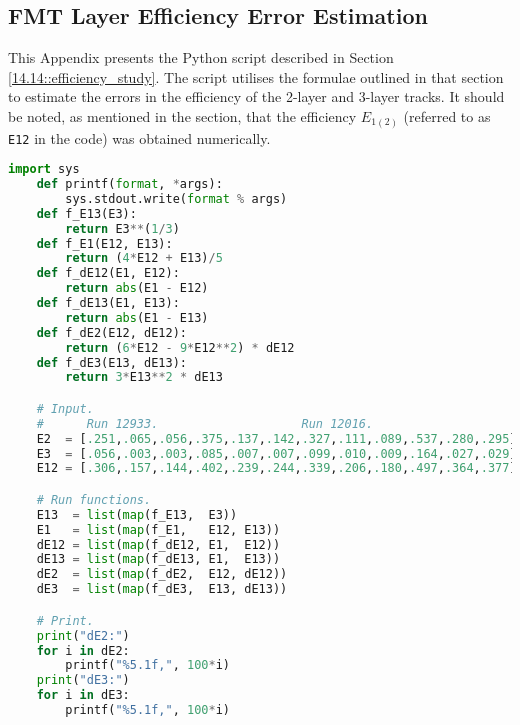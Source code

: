 \subsection{FMT Layer Efficiency Error Estimation}
\label{20.03::fmt_layer_efficiency_error_estimation}
    This Appendix presents the Python script described in Section \ref{14.14::efficiency_study}.
    The script utilises the formulae outlined in that section to estimate the errors in the efficiency of the 2-layer and 3-layer tracks.
    It should be noted, as mentioned in the section, that the efficiency $E_{1(2)}$ (referred to as \verb|E12| in the code) was obtained numerically.

    \begin{lstlisting}[language=Python]
    import sys
    def printf(format, *args):
        sys.stdout.write(format % args)
    def f_E13(E3):
        return E3**(1/3)
    def f_E1(E12, E13):
        return (4*E12 + E13)/5
    def f_dE12(E1, E12):
        return abs(E1 - E12)
    def f_dE13(E1, E13):
        return abs(E1 - E13)
    def f_dE2(E12, dE12):
        return (6*E12 - 9*E12**2) * dE12
    def f_dE3(E13, dE13):
        return 3*E13**2 * dE13

    # Input.
    #      Run 12933.                    Run 12016.
    E2  = [.251,.065,.056,.375,.137,.142,.327,.111,.089,.537,.280,.295]
    E3  = [.056,.003,.003,.085,.007,.007,.099,.010,.009,.164,.027,.029]
    E12 = [.306,.157,.144,.402,.239,.244,.339,.206,.180,.497,.364,.377]

    # Run functions.
    E13  = list(map(f_E13,  E3))
    E1   = list(map(f_E1,   E12, E13))
    dE12 = list(map(f_dE12, E1,  E12))
    dE13 = list(map(f_dE13, E1,  E13))
    dE2  = list(map(f_dE2,  E12, dE12))
    dE3  = list(map(f_dE3,  E13, dE13))

    # Print.
    print("dE2:")
    for i in dE2:
        printf("%5.1f,", 100*i)
    print("dE3:")
    for i in dE3:
        printf("%5.1f,", 100*i)
    \end{lstlisting}
